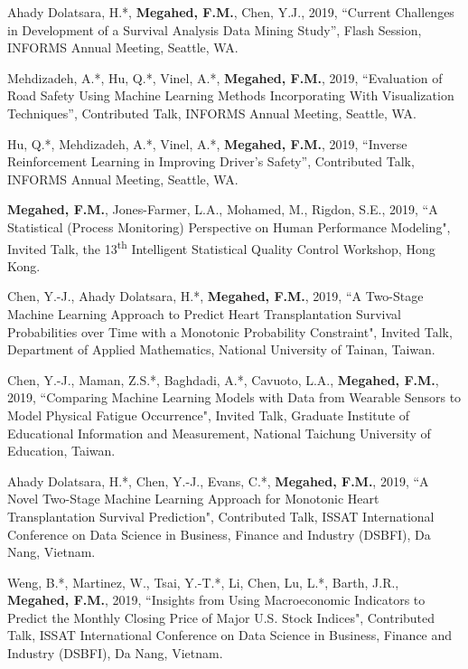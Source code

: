 \documentclass[margin,line]{res}
\begin{document}
\begin{resume}
Ahady Dolatsara, H.*, \textbf{Megahed, F.M.}, Chen, Y.J., 2019, ``Current Challenges in Development of a Survival Analysis Data Mining Study'', Flash Session, INFORMS Annual Meeting, Seattle, WA.

\vspace{-1.5mm}
Mehdizadeh, A.*, Hu, Q.*, Vinel, A.*, \textbf{Megahed, F.M.}, 2019, ``Evaluation of Road Safety Using Machine Learning Methods Incorporating With Visualization Techniques'', Contributed Talk, INFORMS Annual Meeting, Seattle, WA.

\vspace{-1.5mm}
Hu, Q.*, Mehdizadeh, A.*, Vinel, A.*, \textbf{Megahed, F.M.}, 2019, ``Inverse Reinforcement Learning in Improving Driver’s Safety'', Contributed Talk, INFORMS Annual Meeting, Seattle, WA.

\vspace{-1.5mm}
\textbf{Megahed, F.M.}, Jones-Farmer, L.A., Mohamed, M., Rigdon, S.E., 2019, ``A Statistical (Process Monitoring) Perspective on Human Performance Modeling", Invited Talk, the 13\textsuperscript{th} Intelligent Statistical Quality Control Workshop, Hong Kong.

\vspace{-1.5mm}
Chen, Y.-J., Ahady Dolatsara, H.*, \textbf{Megahed, F.M.}, 2019, ``A Two-Stage Machine Learning Approach to Predict Heart Transplantation Survival Probabilities over Time with a Monotonic Probability Constraint", Invited Talk,  Department of Applied Mathematics, National University of Tainan, Taiwan.

\vspace{-1.5mm}
Chen, Y.-J., Maman, Z.S.*, Baghdadi, A.*, Cavuoto, L.A., \textbf{Megahed, F.M.}, 2019, ``Comparing Machine Learning Models with Data from Wearable Sensors to Model Physical Fatigue Occurrence", Invited Talk, Graduate Institute of Educational Information and Measurement, National Taichung University of Education, Taiwan. 

\vspace{-1.5mm}
Ahady Dolatsara, H.*, Chen, Y.-J., Evans, C.*, \textbf{Megahed, F.M.}, 2019, ``A Novel Two-Stage Machine Learning Approach for Monotonic Heart Transplantation Survival Prediction", Contributed Talk, ISSAT International Conference on Data Science in Business, Finance and Industry (DSBFI), Da Nang, Vietnam. 

\vspace{-1.5mm}
Weng, B.*, Martinez, W., Tsai, Y.-T.*, Li, Chen, Lu, L.*, Barth, J.R., \textbf{Megahed, F.M.}, 2019, ``Insights from Using Macroeconomic Indicators to Predict
the Monthly Closing Price of Major U.S. Stock Indices", Contributed Talk, ISSAT International Conference on Data Science in Business, Finance and Industry (DSBFI), Da Nang, Vietnam. 



\end{resume}
\end{document}
